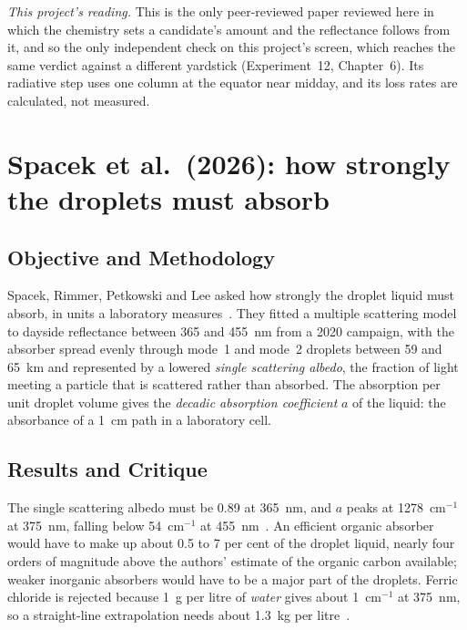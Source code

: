 \emph{This project's reading.} This is the only peer-reviewed paper reviewed here in which
the chemistry sets a candidate's amount and the reflectance follows from it, and so the
only independent check on this
project's screen, which reaches the same verdict against a different yardstick
(Experiment~12, Chapter~6). Its radiative step uses one column at the equator near
midday, and its loss rates are calculated, not measured.

\section{Spacek et al.\ (2026): how strongly the droplets must absorb}
\label{sec:lit-spacek}

\subsection{Objective and Methodology}

Spacek, Rimmer, Petkowski and Lee asked how strongly the droplet liquid must absorb, in
units a laboratory measures~\cite{spacek2026}. They fitted a multiple scattering model to
dayside reflectance between 365 and 455~nm from a 2020 campaign, with the absorber spread
evenly through mode~1 and mode~2 droplets between 59 and 65~km and represented by a
lowered \emph{single scattering albedo}, the fraction of light meeting a particle that
is scattered rather than absorbed. The absorption per unit droplet volume gives the
\emph{decadic absorption coefficient} $a$ of the liquid: the absorbance of a 1~cm path
in a laboratory cell.

\subsection{Results and Critique}

The single scattering albedo must be 0.89 at 365~nm, and $a$ peaks at 1278~cm$^{-1}$ at
375~nm, falling below 54~cm$^{-1}$ at 455~nm~\cite{spacek2026}. An efficient organic
absorber would have to make up about 0.5 to 7 per cent of the droplet liquid, nearly four
orders of magnitude above the authors' estimate of the organic carbon available; weaker
inorganic absorbers would have to be a major part of the droplets. Ferric chloride is
rejected because 1~g per litre of \emph{water} gives about 1~cm$^{-1}$ at 375~nm, so a
straight-line extrapolation needs about 1.3~kg per litre~\cite{spacek2026}.

